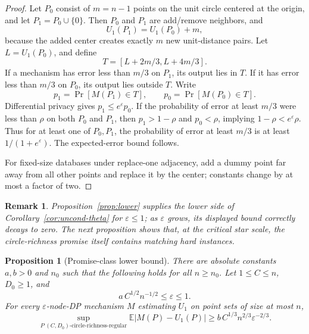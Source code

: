 \documentclass[11pt]{article}
\newtheorem{proposition}[theorem]{Proposition}
\newtheorem{remark}[theorem]{Remark}
\newcommand{\eps}{\varepsilon}
\begin{document}
\begin{proof}
Let \(P_0\) consist of \(m=n-1\) points on the unit circle centered at the origin, and let \(P_1=P_0\cup\{0\}\). Then \(P_0\) and \(P_1\) are add/remove neighbors, and
\[
U_1(P_1)=U_1(P_0)+m,
\]
because the added center creates exactly \(m\) new unit-distance pairs. Let \(L=U_1(P_0)\), and define
\[
T=[L+2m/3,L+4m/3].
\]
If a mechanism has error less than \(m/3\) on \(P_1\), its output lies in \(T\). If it has error less than \(m/3\) on \(P_0\), its output lies outside \(T\). Write
\[
p_1=\Pr[M(P_1)\in T],\qquad p_0=\Pr[M(P_0)\in T].
\]
Differential privacy gives \(p_1\le e^\eps p_0\). If the probability of error at least \(m/3\) were less than \(\rho\) on both \(P_0\) and \(P_1\), then \(p_1>1-\rho\) and \(p_0<\rho\), implying \(1-\rho<e^\eps\rho\). Thus for at least one of \(P_0,P_1\), the probability of error at least \(m/3\) is at least \(1/(1+e^\eps)\). The expected-error bound follows.

For fixed-size databases under replace-one adjacency, add a dummy point far away from all other points and replace it by the center; constants change by at most a factor of two.
\end{proof}

\begin{remark}
Proposition~\ref{prop:lower} supplies the lower side of Corollary~\ref{cor:uncond-theta} for \(\eps\le1\); as \(\eps\) grows, its displayed bound correctly decays to zero. The next proposition shows that, at the critical star scale, the circle-richness promise itself contains matching hard instances.
\end{remark}

\begin{proposition}[Promise-class lower bound]
\label{prop:promise-lower}
There are absolute constants \(a,b>0\) and \(n_0\) such that the following holds for all \(n\ge n_0\). Let \(1\le C\le n\), \(D_0\ge1\), and
\[
a\,C^{1/2}n^{-1/2}\le \eps\le 1.
\]
For every \(\eps\)-node-DP mechanism \(M\) estimating \(U_1\) on point sets of size at most \(n\),
\[
\sup_{P\ \text{\((C,D_0)\)-circle-richness-regular}}
\mathbb{E}|M(P)-U_1(P)|
\ge b\,C^{1/3}n^{2/3}\eps^{-2/3}.
\]
\end{proposition}
\end{document}
